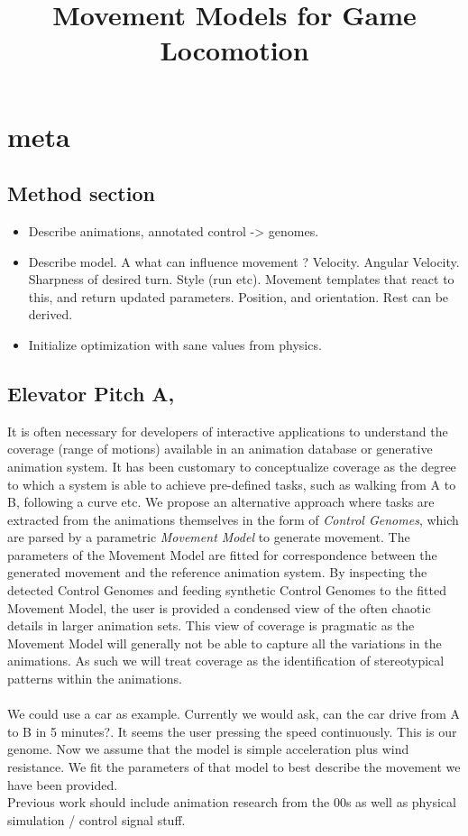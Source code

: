 \documentclass[format=acmtog]{acmart}
\begin{document}
\title{Movement Models for Game Locomotion}









\maketitle

\section{meta}
\subsection{Method section}
\begin{itemize}
    \item Describe animations, annotated control -> genomes.
    \item Describe model. A what can influence movement ? Velocity. Angular Velocity. Sharpness of desired turn. Style (run etc). Movement templates that react to this, and return updated parameters. Position, and orientation. Rest can be derived.
    \item Initialize optimization with sane values from physics.
\end{itemize}

\subsection{Elevator Pitch A,}
It is often necessary for developers of interactive applications to understand the coverage (range of motions) available in an animation database or generative animation system. It has been customary to conceptualize coverage as the degree to which a system is able to achieve pre-defined tasks, such as walking from A to B, following a curve etc. We propose an alternative approach where tasks are extracted from the animations themselves in the form of \textit{Control Genomes}, which are parsed by a parametric \textit{Movement Model} to generate movement. The parameters of the Movement Model are fitted for correspondence between the generated movement and the reference animation system. By inspecting the detected Control Genomes and feeding synthetic Control Genomes to the fitted Movement Model, the user is provided a condensed view of the often chaotic details in larger animation sets. This view of coverage is pragmatic as the Movement Model will generally not be able to capture all the variations in the animations. As such we will treat coverage as the identification of stereotypical patterns within the animations.   
\\\\ 
We could use a car as example. Currently we would ask, can the car drive from A to B in 5 minutes?. It seems the user pressing the speed continuously. This is our genome. Now we assume that the model is simple acceleration plus wind resistance. We fit the parameters of that model to best describe the movement we have been provided. \\ Previous work should include animation research from the 00s as well as physical simulation / control signal stuff.  
\end{document}
